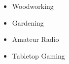 \section{}

\vspace{8pt} %

\begin{multicols}{4}
\begin{itemize}
\item Woodworking
\item Gardening
\item Amateur Radio 
\item Tabletop Gaming
\end{itemize}
\end{multicols}